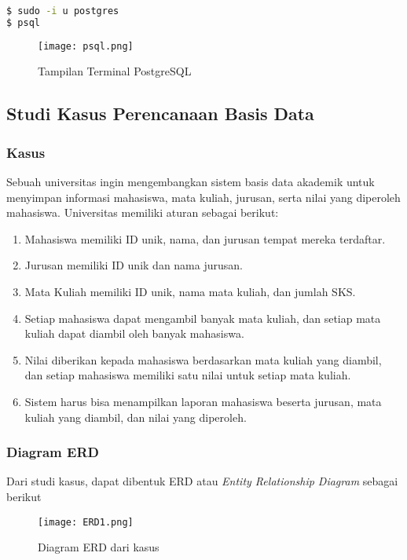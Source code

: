 \documentclass[12pt,a4paper]{article}
\begin{document}
\begin{lstlisting}[language=sh]
$ sudo -i u postgres
$ psql
\end{lstlisting}

\begin{figure}[h]
  \centering
  \texttt{[image: psql.png]}
  \caption{\small{Tampilan Terminal PostgreSQL}}
\end{figure}

\subsection{Studi Kasus Perencanaan Basis Data}

\subsubsection{Kasus}

Sebuah universitas ingin mengembangkan sistem basis data akademik untuk menyimpan informasi mahasiswa, mata kuliah, jurusan, serta nilai yang diperoleh mahasiswa. Universitas memiliki aturan sebagai berikut:

\begin{enumerate}
  \item Mahasiswa memiliki ID unik, nama, dan jurusan tempat mereka terdaftar.
  \item Jurusan memiliki ID unik dan nama jurusan.
  \item Mata Kuliah memiliki ID unik, nama mata kuliah, dan jumlah SKS.
  \item Setiap mahasiswa dapat mengambil banyak mata kuliah, dan setiap mata kuliah dapat diambil oleh banyak mahasiswa.
  \item Nilai diberikan kepada mahasiswa berdasarkan mata kuliah yang diambil, dan setiap mahasiswa memiliki satu nilai untuk setiap mata kuliah.
  \item Sistem harus bisa menampilkan laporan mahasiswa beserta jurusan, mata kuliah yang diambil, dan nilai yang diperoleh.
\end{enumerate}

\newpage

\subsubsection{Diagram ERD}

Dari studi kasus, dapat dibentuk ERD atau \emph{Entity Relationship Diagram} sebagai
berikut

\begin{figure}[h]
  \centering
  \texttt{[image: ERD1.png]}
  \caption{\small{Diagram ERD dari kasus}}
\end{figure}
\end{document}
